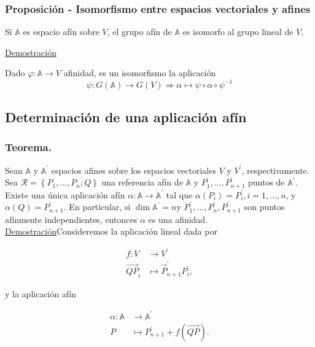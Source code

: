 \documentclass[12pt, a4paper, ones, notitlepage, openany,titlepage]{article}
\newcommand{\demostracion}{\noindent\underline{Demostración}}
\begin{document}
\subsubsection{Proposición - Isomorfismo entre espacios vectoriales y afines}
\noindent Si $\mathbb{A}$ es espacio afín sobre $V$, el grupo afín de $\mathbb{A}$ es isomorfo al grupo lineal de $V$.

\demostracion

Dado $\varphi : \mathbb{A} \longrightarrow V$ afinidad, es un isomorfismo la aplicación
$$
\psi : G(\mathbb{A}) \longrightarrow G(V) \Longrightarrow \alpha \longmapsto \psi \circ \alpha \circ \psi^{-1}
$$

\subsection{Determinación de una aplicación afín}

\subsubsection{Teorema.} Sean $\mathbb{A}$ y $\mathbb{A}^{\prime}$ espacios afines sobre los espacios vectoriales $V$ y $V^{\prime}$, respectivamente. Sea $\mathcal{R}=\left\{P_{1}, \ldots, P_{n} ; Q\right\}$ una referencia afín de $\mathbb{A}$ y $P_{1}^{\prime}, \ldots, P_{n+1}^{\prime}$ puntos de $\mathbb{A}^{\prime}$. Existe una única aplicación afín $\alpha: \mathbb{A} \rightarrow \mathbb{A}^{\prime}$ tal que $\alpha\left(P_{i}\right)=P_{i}^{\prime}, i=1, \ldots, n$, y $\alpha(Q)=P_{n+1}^{\prime}$. En particular, si $\dim  \mathbb{A}^{\prime}=n \mathrm{y}$ $P_{1}^{\prime}, \ldots, P_{n}^{\prime}, P_{n+1}^{\prime}$ son puntos afínmente independientes, entonces $\alpha$ es una afinidad.\\

\demostracion Consideremos la aplicación lineal dada por

$$
\begin{aligned}
f: V & \longrightarrow V^{\prime} \\
\overrightarrow{Q P}_{i} & \longmapsto \vec{P}_{n+1}^{\prime} P_{i}^{\prime},
\end{aligned}
$$

y la aplicación afín

$$
\begin{aligned}
\alpha: \mathbb{A} & \longrightarrow \mathbb{A}^{\prime} \\
P & \longmapsto P_{n+1}^{\prime}+f(\overrightarrow{Q P}) .
\end{aligned}
$$
\end{document}
